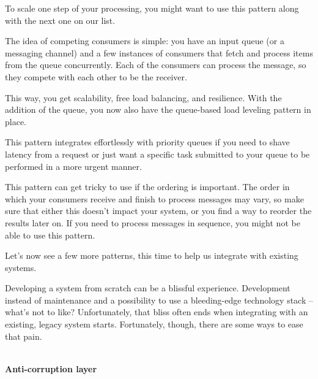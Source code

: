 To scale one step of your processing, you might want to use this pattern along with the next one on our list.




The idea of competing consumers is simple: you have an input queue (or a messaging channel) and a few instances of consumers that fetch and process items from the queue concurrently. Each of the consumers can process the message, so they compete with each other to be the receiver.

This way, you get scalability, free load balancing, and resilience. With the addition of the queue, you now also have the queue-based load leveling pattern in place.

This pattern integrates effortlessly with priority queues if you need to shave latency from a request or just want a specific task submitted to your queue to be performed in a more urgent manner.

\begin{tcolorbox}[colback=blue!5!white,colframe=blue!75!black, title=Note]
\hspace*{0.7cm}This pattern can get tricky to use if the ordering is important. The order in which your consumers receive and finish to process messages may vary, so make sure that either this doesn't impact your system, or you find a way to reorder the results later on. If you need to process messages in sequence, you might not be able to use this pattern.

\end{tcolorbox}

Let's now see a few more patterns, this time to help us integrate with existing systems.


Developing a system from scratch can be a blissful experience. Development instead of maintenance and a possibility to use a bleeding-edge technology stack – what's not to like? Unfortunately, that bliss often ends when integrating with an existing, legacy system starts. Fortunately, though, there are some ways to ease that pain.


\hspace*{\fill} \\ %
\noindent
\textbf{Anti-corruption layer}

